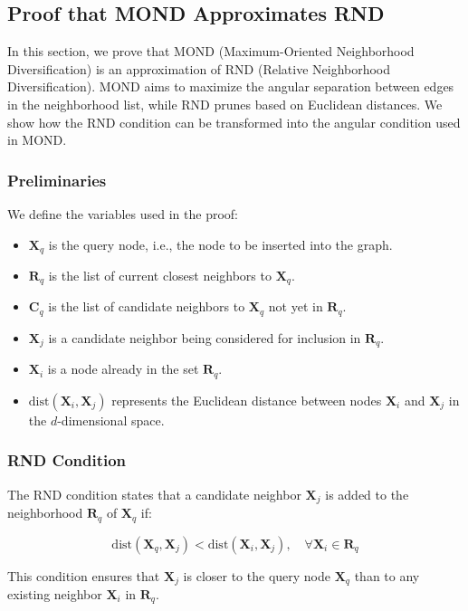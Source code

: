 \subsection{Proof that MOND Approximates RND}

In this section, we prove that MOND (Maximum-Oriented Neighborhood Diversification) is an approximation of RND (Relative Neighborhood Diversification). MOND aims to maximize the angular separation between edges in the neighborhood list, while RND prunes based on Euclidean distances. We show how the RND condition can be transformed into the angular condition used in MOND.

\subsubsection{Preliminaries}

We define the variables used in the proof:

\begin{itemize}
    \item \(\mathbf{X}_q\) is the query node, i.e., the node to be inserted into the graph.
    \item \(\mathbf{R}_q\) is the list of current closest neighbors to \(\mathbf{X}_q\).
    \item \(\mathbf{C}_q\) is the list of candidate neighbors to \(\mathbf{X}_q\) not yet in \(\mathbf{R}_q\).
    \item \(\mathbf{X}_j\) is a candidate neighbor being considered for inclusion in \(\mathbf{R}_q\).
    \item \(\mathbf{X}_i\) is a node already in the set \(\mathbf{R}_q\).
    \item \(\text{dist}(\mathbf{X}_i, \mathbf{X}_j)\) represents the Euclidean distance between nodes \(\mathbf{X}_i\) and \(\mathbf{X}_j\) in the \(d\)-dimensional space.
\end{itemize}

\subsubsection{RND Condition}

The RND condition states that a candidate neighbor \(\mathbf{X}_j\) is added to the neighborhood \(\mathbf{R}_q\) of \(\mathbf{X}_q\) if:

\[
\text{dist}(\mathbf{X}_q, \mathbf{X}_j) < \text{dist}(\mathbf{X}_i, \mathbf{X}_j), \quad \forall \mathbf{X}_i \in \mathbf{R}_q
\]

This condition ensures that \(\mathbf{X}_j\) is closer to the query node \(\mathbf{X}_q\) than to any existing neighbor \(\mathbf{X}_i\) in \(\mathbf{R}_q\).

